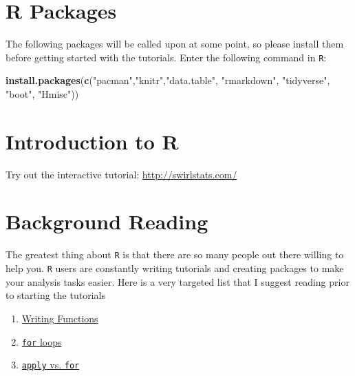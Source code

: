 \documentclass[]{book}
\makeatletter
\newenvironment{Shaded}{\begin{snugshade}}{\end{snugshade}}
\newcommand{\KeywordTok}[1]{\textcolor[rgb]{0.13,0.29,0.53}{\textbf{#1}}}
\newcommand{\StringTok}[1]{\textcolor[rgb]{0.31,0.60,0.02}{#1}}
\newcommand{\NormalTok}[1]{#1}
\providecommand{\tightlist}{%
  \setlength{\itemsep}{0pt}\setlength{\parskip}{0pt}}
\providecommand{\tightlist}{%
  \setlength{\itemsep}{0pt}\setlength{\parskip}{0pt}}
\newenvironment{kframe}{%
\medskip{}
\setlength{\fboxsep}{.8em}
 \def\at@end@of@kframe{}%
 \ifinner\ifhmode%
  \def\at@end@of@kframe{\end{minipage}}%
  \begin{minipage}{\columnwidth}%
 \fi\fi%
 \def\FrameCommand##1{\hskip\@totalleftmargin \hskip-\fboxsep
 \colorbox{shadecolor}{##1}\hskip-\fboxsep
     \hskip-\linewidth \hskip-\@totalleftmargin \hskip\columnwidth}%
 \MakeFramed {\advance\hsize-\width
   \@totalleftmargin\z@ \linewidth\hsize
   \@setminipage}}%
 {\par\unskip\endMakeFramed%
 \at@end@of@kframe}
\renewenvironment{Shaded}{\begin{kframe}}{\end{kframe}}
\theoremstyle{definition}
\theoremstyle{definition}
\theoremstyle{definition}
\theoremstyle{remark}
\makeatother
\begin{document}
\section*{R Packages}\label{r-packages}

The following packages will be called upon at some point, so please
install them before getting started with the tutorials. Enter the
following command in \texttt{R}:

\begin{Shaded}
\begin{Highlighting}[]
\KeywordTok{install.packages}\NormalTok{(}\KeywordTok{c}\NormalTok{(}\StringTok{"pacman"}\NormalTok{,}\StringTok{"knitr"}\NormalTok{,}\StringTok{"data.table"}\NormalTok{, }\StringTok{"rmarkdown"}\NormalTok{, }\StringTok{"tidyverse"}\NormalTok{, }\StringTok{"boot"}\NormalTok{, }\StringTok{"Hmisc"}\NormalTok{))}
\end{Highlighting}
\end{Shaded}

\section*{Introduction to R}\label{introduction-to-r}

Try out the interactive tutorial: \url{http://swirlstats.com/}

\section*{Background Reading}\label{background-reading}

The greatest thing about \texttt{R} is that there are so many people out
there willing to help you. \texttt{R} users are constantly writing
tutorials and creating packages to make your analysis tasks easier. Here
is a very targeted list that I suggest reading prior to starting the
tutorials

\begin{enumerate}
\def\labelenumi{\arabic{enumi}.}
\tightlist
\item
  \href{http://r4ds.had.co.nz/functions.html}{Writing Functions}
\item
  \href{http://r4ds.had.co.nz/iteration.html}{\texttt{for} loops}
\item
  \href{https://kbroman.wordpress.com/2013/04/02/apply-vs-for/}{\texttt{apply}
  vs. \texttt{for}}
\end{enumerate}
\end{document}
